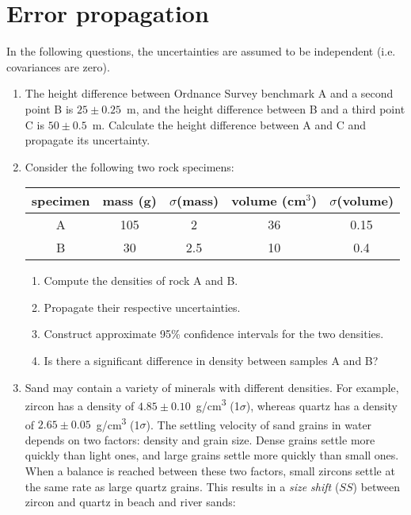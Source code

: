 \section{Error propagation}
\label{sec:ex-errorprop}

In the following questions, the uncertainties are assumed to be
independent (i.e. covariances are zero).

\begin{enumerate}
  
\item The height difference between Ordnance Survey benchmark A and a
  second point B is $25\pm0.25$~m, and the height difference between B
  and a third point C is $50\pm0.5$~m. Calculate the height difference
  between A and C and propagate its uncertainty.
  
\item Consider the following two rock specimens:

\begin{tabular}{ccccc}
specimen & mass (g) & $\sigma$(mass) & volume (cm$^3$) & $\sigma$(volume) \\
\hline 
A & 105 & 2 & 36 & 0.15\\
B & 30 & 2.5 & 10 & 0.4
\end{tabular}

\begin{enumerate}
\item Compute the densities of rock A and B.
\item Propagate their respective uncertainties.
\item Construct approximate 95\% confidence intervals for the two densities.
\item Is there a significant difference in density between samples A and B?
\end{enumerate}

\item Sand may contain a variety of minerals with different densities.
  For example, zircon has a density of
  $4.85\pm0.10$~g/cm\textsuperscript{3} (1$\sigma$), whereas quartz
  has a density of $2.65\pm0.05$~g/cm\textsuperscript{3} (1$\sigma$).
  The settling velocity of sand grains in water depends on two
  factors: density and grain size. Dense grains settle more quickly
  than light ones, and large grains settle more quickly than small
  ones. When a balance is reached between these two factors, small
  zircons settle at the same rate as large quartz grains. This results
  in a \emph{size shift} ($SS$) between zircon and quartz in beach and
  river sands:


\end{enumerate}
